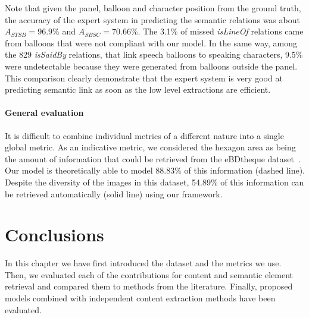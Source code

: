 Note that given the panel, balloon and character position from the ground truth, the accuracy of the expert system in predicting the semantic relations was about $A_{STSB}=96.9\%$ and $A_{SBSC}=70.66\%$.
The 3.1\% of missed \emph{isLineOf} relations came from balloons that were not compliant with our model.
In the same way, among the 829 \emph{isSaidBy} relations, that link speech balloons to speaking characters, 9.5\% were undetectable because they were generated from balloons outside the panel.
This comparison clearly demonstrate that the expert system is very good at predicting semantic link as soon as the low level extractions are efficient.




\paragraph{General evaluation} %
\label{par:global_evaluation}
It is difficult to combine individual metrics of a different nature into a single global metric.
As an indicative metric, we considered the hexagon area as being the amount of information that could be retrieved from the eBDtheque dataset~\cite{Guerin2013}.
Our model is theoretically able to model 88.83\% of this information (dashed line).
Despite the diversity of the images in this dataset, 54.89\% of this information can be retrieved automatically (solid line) using our framework.








\section{Conclusions}
\label{sub:ex:conclusion}

In this chapter we have first introduced the dataset and the metrics we use. Then, we evaluated each of the contributions for content and semantic element retrieval and compared them to methods from the literature.
Finally, proposed models combined with independent content extraction methods have been evaluated.

